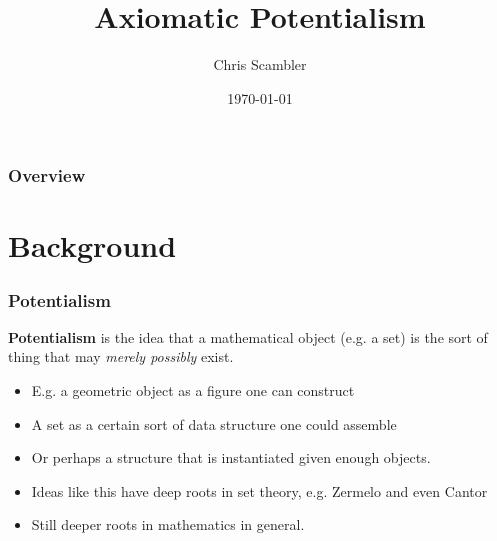 \documentclass[handout]{beamer}
\title[Axiomatic Potentialism]{Axiomatic Potentialism}
\author{Chris Scambler}
\institute[ASC] 
{
All Souls College, \\
Oxford University \\ 
\medskip
\textit{chris.scambler@all-souls.ox.ac.uk} 
}
\date{\today}
\begin{document}
\begin{frame}
\titlepage 
\end{frame}

\begin{frame}
\frametitle{Overview} 
\tableofcontents 
\end{frame}
\section{Background}

\begin{frame}
\frametitle{Potentialism}
\begin{block}
    {\bf Potentialism} is the idea that a mathematical object (e.g. a set) is the sort 
    of thing that may \emph{merely possibly} exist.
\end{block}
\begin{itemize}
    \item<3-> E.g. a geometric object as a figure one can construct
    \item<4-> A set as a certain sort of data structure one could assemble
    \item<5-> Or perhaps a structure that is instantiated given enough objects.
    \item<6-> Ideas like this have deep roots in set theory, e.g. Zermelo and even Cantor
    \item<7-> Still deeper roots in mathematics in general.
\end{itemize}
\end{frame}
\end{document}
